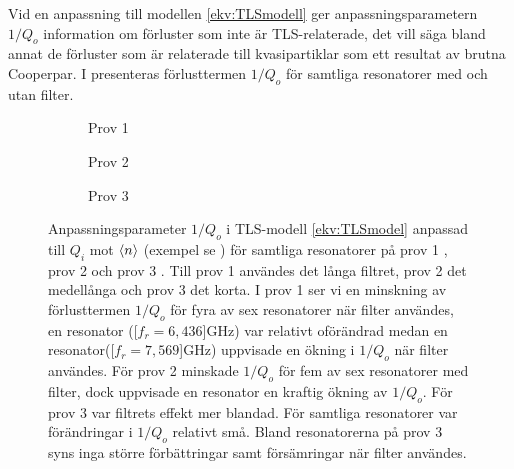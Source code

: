 \documentclass[main.tex]{subfiles}
\begin{document}
Vid en anpassning till modellen \eqref{ekv:TLSmodell} ger anpassningsparametern $1/Q_o$ information om förluster som inte är TLS-relaterade, det vill säga bland annat de förluster som är relaterade till kvasipartiklar som ett resultat av brutna Cooperpar. I  presenteras förlusttermen $1/Q_o$ för samtliga resonatorer med och utan filter.


\begin{figure}[H]
    \centerfloat
    \begin{minipage}{0.85\paperwidth}
    \centerfloat
    \begin{subfigure}{0.33\textwidth}
    \centering
    \setlength{}
    \setlength\figureheight{8em}
    
    \caption{Prov 1}
    \label{fig:Q_other_1}
    \end{subfigure}
    \begin{subfigure}{0.33\textwidth}
    \centering
    \setlength{}
    \setlength\figureheight{8em}
    
    \caption{Prov 2}
    \label{fig:Q_other_2}
    \end{subfigure}
    \hspace{-1em}
    \begin{subfigure}{0.4\paperwidth}
    \centering
    \setlength{}
    \setlength\figureheight{8em}
    
    \caption{Prov 3}
    \label{fig:Q_other_3}
    \end{subfigure}
    \end{minipage}
    \caption{Anpassningsparameter $1/Q_o$ i TLS-modell \eqref{ekv:TLSmodel} anpassad till $Q_i$ mot $\expval{n}$ (exempel se ) för samtliga resonatorer på prov 1 , prov 2  och prov 3 . Till prov 1 användes det långa filtret, prov 2 det medellånga och prov 3 det korta. I prov 1 ser vi en minskning av förlusttermen $1/Q_o$ för fyra av sex resonatorer när filter användes, en resonator (\unit[$f_r=6,436$]{GHz}) var relativt oförändrad medan en resonator(\unit[$f_r=7,569$]{GHz}) uppvisade en ökning i $1/Q_o$ när filter användes. För prov 2 minskade $1/Q_o$ för fem av sex resonatorer med filter, dock uppvisade en resonator en kraftig ökning av $1/Q_o$. För prov 3 var filtrets effekt mer blandad. För samtliga resonatorer var förändringar i $1/Q_o$ relativt små. Bland resonatorerna på prov 3 syns inga större förbättringar samt försämringar när filter användes.}
    \label{fig:Q_other}
\end{figure}
\end{document}
